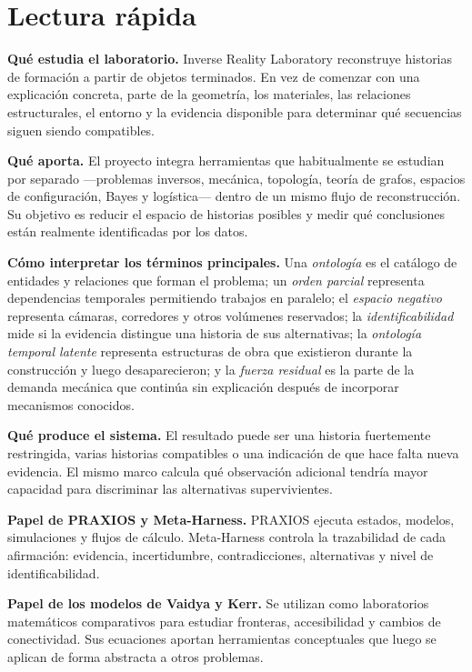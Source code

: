 \documentclass[11pt,a4paper]{article}
\begin{document}
\section*{Lectura rápida}

\textbf{Qué estudia el laboratorio.}
Inverse Reality Laboratory reconstruye historias de formación a partir de objetos terminados. En vez de comenzar con una explicación concreta, parte de la geometría, los materiales, las relaciones estructurales, el entorno y la evidencia disponible para determinar qué secuencias siguen siendo compatibles.

\textbf{Qué aporta.}
El proyecto integra herramientas que habitualmente se estudian por separado ---problemas inversos, mecánica, topología, teoría de grafos, espacios de configuración, Bayes y logística--- dentro de un mismo flujo de reconstrucción. Su objetivo es reducir el espacio de historias posibles y medir qué conclusiones están realmente identificadas por los datos.

\textbf{Cómo interpretar los términos principales.}
Una \emph{ontología} es el catálogo de entidades y relaciones que forman el problema; un \emph{orden parcial} representa dependencias temporales permitiendo trabajos en paralelo; el \emph{espacio negativo} representa cámaras, corredores y otros volúmenes reservados; la \emph{identificabilidad} mide si la evidencia distingue una historia de sus alternativas; la \emph{ontología temporal latente} representa estructuras de obra que existieron durante la construcción y luego desaparecieron; y la \emph{fuerza residual} es la parte de la demanda mecánica que continúa sin explicación después de incorporar mecanismos conocidos.

\textbf{Qué produce el sistema.}
El resultado puede ser una historia fuertemente restringida, varias historias compatibles o una indicación de que hace falta nueva evidencia. El mismo marco calcula qué observación adicional tendría mayor capacidad para discriminar las alternativas supervivientes.

\textbf{Papel de PRAXIOS y Meta-Harness.}
PRAXIOS ejecuta estados, modelos, simulaciones y flujos de cálculo. Meta-Harness controla la trazabilidad de cada afirmación: evidencia, incertidumbre, contradicciones, alternativas y nivel de identificabilidad.

\textbf{Papel de los modelos de Vaidya y Kerr.}
Se utilizan como laboratorios matemáticos comparativos para estudiar fronteras, accesibilidad y cambios de conectividad. Sus ecuaciones aportan herramientas conceptuales que luego se aplican de forma abstracta a otros problemas.
\end{document}
